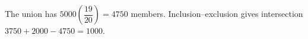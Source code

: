 The union has $5000(\dfrac{19}{20})=4750$ members. Inclusion--exclusion gives intersection $3750+2000-4750=\boxed{1000}$.

